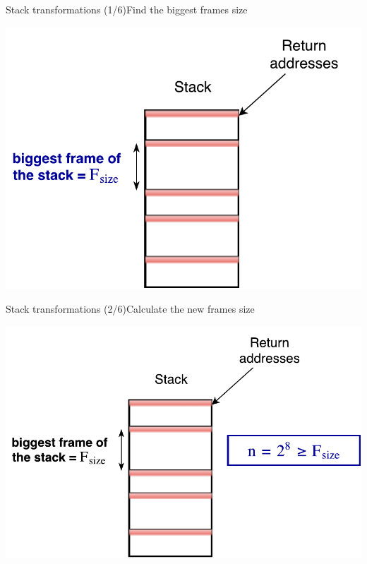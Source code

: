 \documentclass{beamer}
\begin{document}
\begin{frame}[c]{Stack transformations (1/6)}{Find the biggest frames size}
	\begin{center}
		\includegraphics[height=0.6\textheight]{images/stack_transfo_0.pdf}
	\end{center}
\end{frame}
\begin{frame}[c]{Stack transformations (2/6)}{Calculate the new frames size}
	\begin{center}
		\includegraphics[height=0.6\textheight]{images/stack_transfo_1.pdf}
	\end{center}
\end{frame}
\end{document}
